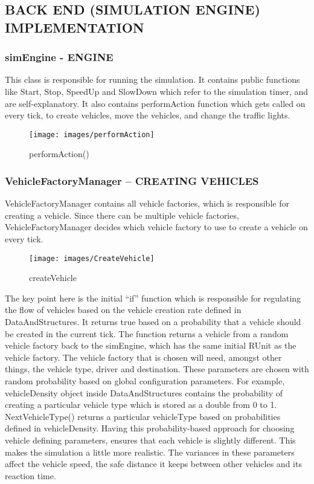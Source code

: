 \documentclass[11pt,a4paper]{article}
\begin{document}
 \subsection{BACK END (SIMULATION ENGINE) IMPLEMENTATION}
  
  \subsubsection{simEngine - ENGINE} 
  This class is responsible for running the simulation. It contains public functions like Start, Stop, SpeedUp and SlowDown which refer to the simulation timer, and are self-explanatory. It also contains performAction function which gets called on every tick, to create vehicles, move the vehicles, and change the traffic lights.
    	\begin{figure}[h!]
			\texttt{[image: images/performAction]}
			\caption{performAction()}
			\centering
		\end{figure} 

 
  \subsubsection{VehicleFactoryManager – CREATING VEHICLES}
  
  VehicleFactoryManager contains all vehicle factories, which is responsible for creating a vehicle. Since there can be multiple vehicle factories, VehicleFactoryManager decides which vehicle factory to use to create a vehicle on every tick. 
  
  		\begin{figure}[h!]
			\texttt{[image: images/CreateVehicle]}
			\caption{createVehicle}
			\centering
		\end{figure} 
		
	The key point here is the initial “if” function which is responsible for regulating the flow of vehicles based on the vehicle creation rate defined in DataAndStructures. It returns true based on a probability that a vehicle should be created in the current tick. 
The function returns a vehicle from a random vehicle factory back to the simEngine, which has the same initial RUnit as the vehicle factory. 
The vehicle factory that is chosen will need, amongst other things, the vehicle type, driver and destination. These parameters are chosen with random probability based on global configuration parameters. For example, vehicleDensity object inside DataAndStructures contains the probability of creating a particular vehicle type which is stored as a double from 0 to 1. NextVehicleType() returns a particular vehicleType based on probabilities defined in vehicleDensity.
Having this probability-based approach for choosing vehicle defining parameters, ensures that each vehicle is slightly different. This makes the simulation a little more realistic. The variances in these parameters affect the vehicle speed, the safe distance it keeps between other vehicles and its reaction time.
  
\end{document}
